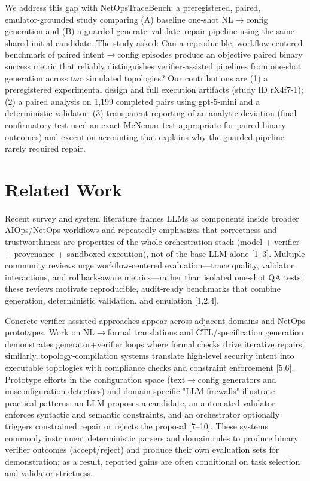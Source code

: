\documentclass[conference]{IEEEtran}
\begin{document}
We address this gap with NetOpsTraceBench: a preregistered, paired, emulator‑grounded study comparing (A) baseline one‑shot NL\ensuremath{\rightarrow}config generation and (B) a guarded generate--validate--repair pipeline using the same shared initial candidate. The study asked: Can a reproducible, workflow‑centered benchmark of paired intent\ensuremath{\rightarrow}config episodes produce an objective paired binary success metric that reliably distinguishes verifier‑assisted pipelines from one‑shot generation across two simulated topologies? Our contributions are (1) a preregistered experimental design and full execution artifacts (study ID rX4f7-1); (2) a paired analysis on 1,199 completed pairs using gpt-5-mini and a deterministic validator; (3) transparent reporting of an analytic deviation (final confirmatory test used an exact McNemar test appropriate for paired binary outcomes) and execution accounting that explains why the guarded pipeline rarely required repair.

\section{Related Work}
Recent survey and system literature frames LLMs as components inside broader AIOps/NetOps workflows and repeatedly emphasizes that correctness and trustworthiness are properties of the whole orchestration stack (model + verifier + provenance + sandboxed execution), not of the base LLM alone [1--3]. Multiple community reviews urge workflow‑centered evaluation---trace quality, validator interactions, and rollback‑aware metrics---rather than isolated one‑shot QA tests; these reviews motivate reproducible, audit‑ready benchmarks that combine generation, deterministic validation, and emulation [1,2,4].

Concrete verifier‑assisted approaches appear across adjacent domains and NetOps prototypes. Work on NL\ensuremath{\rightarrow}formal translations and CTL/specification generation demonstrates generator+verifier loops where formal checks drive iterative repairs; similarly, topology‑compilation systems translate high‑level security intent into executable topologies with compliance checks and constraint enforcement [5,6]. Prototype efforts in the configuration space (text\ensuremath{\rightarrow}config generators and misconfiguration detectors) and domain‑specific "LLM firewalls" illustrate practical patterns: an LLM proposes a candidate, an automated validator enforces syntactic and semantic constraints, and an orchestrator optionally triggers constrained repair or rejects the proposal [7--10]. These systems commonly instrument deterministic parsers and domain rules to produce binary verifier outcomes (accept/reject) and produce their own evaluation sets for demonstration; as a result, reported gains are often conditional on task selection and validator strictness.
\end{document}
